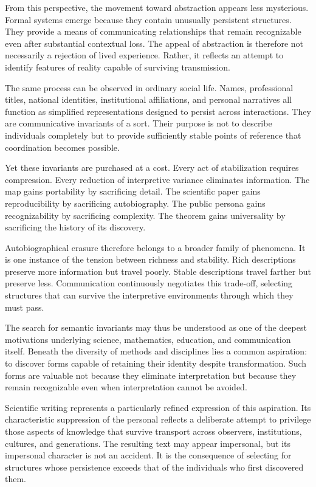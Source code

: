 \documentclass[11pt]{article}
\theoremstyle{plain}
\begin{document}
From this perspective, the movement toward abstraction appears less mysterious. Formal systems emerge because they contain unusually persistent structures. They provide a means of communicating relationships that remain recognizable even after substantial contextual loss. The appeal of abstraction is therefore not necessarily a rejection of lived experience. Rather, it reflects an attempt to identify features of reality capable of surviving transmission.

The same process can be observed in ordinary social life. Names, professional titles, national identities, institutional affiliations, and personal narratives all function as simplified representations designed to persist across interactions. They are communicative invariants of a sort. Their purpose is not to describe individuals completely but to provide sufficiently stable points of reference that coordination becomes possible.

Yet these invariants are purchased at a cost. Every act of stabilization requires compression. Every reduction of interpretive variance eliminates information. The map gains portability by sacrificing detail. The scientific paper gains reproducibility by sacrificing autobiography. The public persona gains recognizability by sacrificing complexity. The theorem gains universality by sacrificing the history of its discovery.

Autobiographical erasure therefore belongs to a broader family of phenomena. It is one instance of the tension between richness and stability. Rich descriptions preserve more information but travel poorly. Stable descriptions travel farther but preserve less. Communication continuously negotiates this trade-off, selecting structures that can survive the interpretive environments through which they must pass.

The search for semantic invariants may thus be understood as one of the deepest motivations underlying science, mathematics, education, and communication itself. Beneath the diversity of methods and disciplines lies a common aspiration: to discover forms capable of retaining their identity despite transformation. Such forms are valuable not because they eliminate interpretation but because they remain recognizable even when interpretation cannot be avoided.

Scientific writing represents a particularly refined expression of this aspiration. Its characteristic suppression of the personal reflects a deliberate attempt to privilege those aspects of knowledge that survive transport across observers, institutions, cultures, and generations. The resulting text may appear impersonal, but its impersonal character is not an accident. It is the consequence of selecting for structures whose persistence exceeds that of the individuals who first discovered them.
\end{document}
